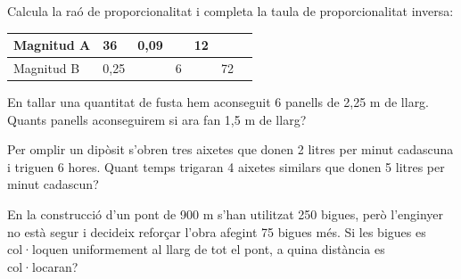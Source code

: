 \begin{mylist}
\exer \spen
 Calcula la raó de
  proporcionalitat i completa la taula de proporcionalitat inversa:

\begin{center}
\begin{tabular}[]{@{}p{2.5cm}|p{1cm}|p{1cm}|p{1cm}|p{1cm}|p{1cm}|p{1cm}@{}}
\toprule
Magnitud A & 36 & 0,09 & & 12 &\tabularnewline
\midrule
Magnitud B & 0,25 & & 6 & & 72\tabularnewline
\bottomrule
\end{tabular}
\end{center}



\exer
  En tallar una quantitat de fusta hem aconseguit 6 panells de 2,25 m de
  llarg. Quants panells aconseguirem si ara fan 1,5 m de llarg?
  
  
  
\exer
  Per omplir un dipòsit s'obren tres aixetes que donen 2 litres per
  minut cadascuna i triguen 6 hores. Quant temps trigaran 4 aixetes
  similars que donen 5 litres per minut cadascun?

\exer
  En la construcció d'un pont de 900 m s'han utilitzat 250 bigues, però
  l'enginyer no està  segur i decideix reforçar l'obra afegint 75
  bigues més. Si les bigues es col·loquen uniformement al llarg de tot
  el pont, a quina distància es col·locaran?

\end{mylist}


